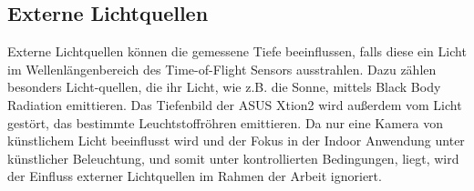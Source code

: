 \documentclass[thesis.tex]{subfiles}
\begin{document}
\subsection{Externe Lichtquellen}

Externe Lichtquellen können die gemessene Tiefe beeinflussen, falls diese ein Licht im Wellenlängenbereich des Time-of-Flight Sensors ausstrahlen. Dazu zählen besonders Licht-quellen, die ihr Licht, wie z.B. die Sonne, mittels Black Body Radiation emittieren. Das Tiefenbild der ASUS Xtion2 wird außerdem vom Licht gestört, das bestimmte Leuchtstoffröhren emittieren. Da nur eine Kamera von künstlichem Licht beeinflusst wird und der Fokus in der Indoor Anwendung unter künstlicher Beleuchtung, und somit unter kontrollierten Bedingungen, liegt, wird der Einfluss externer Lichtquellen im Rahmen der Arbeit ignoriert.

\subfilebib %
\end{document}
